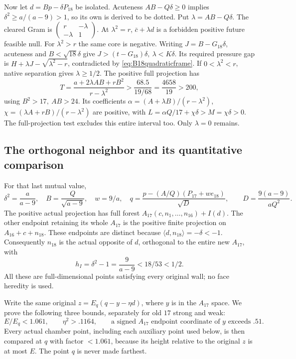 \documentclass[11pt]{article}
\theoremstyle{definition}
\theoremstyle{remark}
\newcommand{\ip}[2]{\langle #1,#2\rangle}
\begin{document}
Now let \(d=Bp-\delta P_{18}\) be isolated.
Acuteness \(AB-Q\delta\geq0\) implies
\(\delta^2\geq a/(a-9)>1\), so its own is derived to be dotted.
Put \(\lambda=AB-Q\delta\).
The cleared Gram is
\(\left(\begin{smallmatrix}r&-\lambda\\-\lambda&1\end{smallmatrix}\right)\).
At \(\lambda^2=r\), \(\bar c+\lambda d\) is a forbidden positive
future feasible null. For \(\lambda^2>r\) the same core is negative.
Writing \(J=B-G_{18}\delta\), acuteness and \(B<\sqrt{18}\delta\)
give \(J>(t-G_{18})\delta,\ \lambda<K\delta\).
Its required pressure gap is
\(H+\lambda J-\sqrt{\lambda^2-r}\), contradicted by
\eqref{eq:B18quadraticframe}.
If \(0<\lambda^2<r\), native separation gives \(\lambda\geq1/2\).
The positive full projection has
\[
 T=\frac{a+2\lambda AB+rB^2}{r-\lambda^2}
 >\frac{68.5}{19/68}=\frac{4658}{19}>200 ,
\]
using \(B^2>17,\ AB>24\).
Its coefficients
\(\alpha=(A+\lambda B)/(r-\lambda^2)\),
\(\chi=(\lambda A+rB)/(r-\lambda^2)\)
are positive, with \(L=\alpha Q/17+\chi\delta>M=\chi\delta>0\).
The full-projection test excludes this entire interval too.
Only \(\lambda=0\) remains.

\subsection{The orthogonal neighbor and its quantitative comparison}
\label{app:B18A17comparison}
For that last mutual value,
\[
 \delta^2=\frac a{a-9},\quad B=\frac Q{\sqrt{a-9}},\quad w=9/a,\quad
 q=\frac{p-(A/Q)(P_{17}+we_{18})}{\sqrt D},\qquad
 D=\frac{9(a-9)}{aQ^2}.
\]
The positive actual projection has full forest
\(A_{17}(c,n_1,\ldots,n_{16})+I(d)\).
The other endpoint retaining its whole \(A_{17}\) is the positive
finite projection on \(A_{16}+c+n_{18}\). These endpoints are distinct
because \(\ip d{n_{18}}=-\delta<-1\).
Consequently \(n_{18}\) is the actual opposite of \(d\), orthogonal
to the entire new \(A_{17}\), with
\[
 h_I=\delta^2-1=\frac9{a-9}<18/53<1/2.
\]
All these are full-dimensional points satisfying every original wall;
no face heredity is used.

Write the same original \(z=E_q(q-y-\eta d)\), where \(y\)
is in the \(A_{17}\) space. We prove the following three bounds,
separately for old \(17\) strong and weak:
\begin{equation}\label{eq:B18A17interface}
 E/E_q<1.061,\qquad \eta^2>.1164,\qquad
 \text{a signed \(A_{17}\) endpoint coordinate of \(y\) exceeds } .51 .
\end{equation}
Every actual chamber point, including each auxiliary point used below,
is then compared at \(q\) with factor \(<1.061\), because its height
relative to the original \(z\) is at most \(E\).
The point \(q\) is never made farthest.
\end{document}
